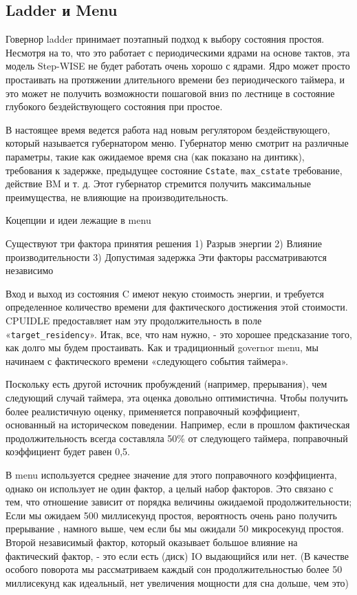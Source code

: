 \documentclass{article}
\begin{document}
\subsection{Ladder и Menu}

Говернор ladder принимает поэтапный подход к выбору состояния простоя. Несмотря на то, что это работает с периодическими ядрами на основе тактов, эта модель Step-WISE не будет работать очень хорошо с ядрами. Ядро может просто простаивать на протяжении длительного времени без периодического таймера, и это может не получить возможности пошаговой вниз по лестнице в состояние глубокого бездействующего состояния при простое.

В настоящее время ведется работа над новым регулятором бездействующего, который называется губернатором меню. Губернатор меню смотрит на различные параметры, такие как ожидаемое время сна (как показано на динтикк), требования к задержке, предыдущее состояние \texttt{C\-state}, \texttt{max\_cstate} требование, действие BM и т. д. Этот губернатор стремится получить максимальные преимущества, не влияющие на производительность.

Коцепции и идеи лежащие в menu

Существуют три фактора принятия решения
1) Разрыв энергии
2) Влияние производительности
3) Допустимая задержка
Эти факторы рассматриваются независимо

Вход и выход из состояния C имеют некую стоимость энергии, и требуется определенное количество времени для фактического достижения этой стоимости. CPUIDLE предоставляет нам эту продолжительность в поле «\texttt{target\_residency}». Итак, все, что нам нужно, - это хорошее предсказание того, как долго мы будем простаивать. Как и традиционный governor menu, мы начинаем с фактического времени «следующего события таймера».

Поскольку есть другой источник пробуждений (например, прерывания), чем следующий случай таймера, эта оценка довольно оптимистична. Чтобы получить более реалистичную оценку, применяется поправочный коэффициент, основанный на историческом поведении. Например, если в прошлом фактическая продолжительность всегда составляла 50\% от следующего таймера, поправочный коэффициент будет равен 0,5.

В menu используется среднее значение для этого поправочного коэффициента, однако он использует не один фактор, а целый набор факторов. Это связано с тем, что отношение зависит от порядка величины ожидаемой продолжительности; Если мы ожидаем 500 миллисекунд простоя, вероятность очень рано получить прерывание , намного выше, чем если бы мы ожидали 50 микросекунд простоя. Второй независимый фактор, который оказывает большое влияние на фактический фактор, - это если есть (диск) IO выдающийся или нет. (В качестве особого поворота мы рассматриваем каждый сон продолжительностью более 50 миллисекунд как идеальный, нет увеличения мощности для сна дольше, чем это)
\end{document}

